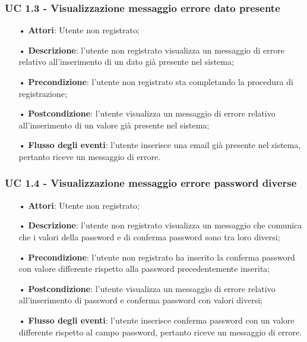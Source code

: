 \subsubsection{UC 1.3 - Visualizzazione messaggio errore dato presente}
\begin{itemize}
	\item[•]\textbf{Attori}: Utente non registrato;
	\item[•]\textbf{Descrizione}: l'utente non registrato visualizza un messaggio di errore relativo all'inserimento
	di un dato già presente nel sistema;
	\item[•]\textbf{Precondizione}: l'utente non registrato sta completando la procedura di registrazione;
	\item[•]\textbf{Postcondizione}: l'utente visualizza un messaggio di errore relativo all'inserimento di un valore già presente nel sistema;
	\item[•]\textbf{Flusso degli eventi}: l'utente inserisce una email già presente nel sistema, pertanto riceve un messaggio di errore.
\end{itemize}

\subsubsection{UC 1.4 - Visualizzazione messaggio errore password diverse}
\begin{itemize}
	\item[•]\textbf{Attori}: Utente non registrato;
	\item[•]\textbf{Descrizione}: l'utente non registrato visualizza un messaggio che comunica che i valori della password e di conferma password sono tra loro diversi;
	\item[•]\textbf{Precondizione}: l'utente non registrato ha inserito la conferma password con valore differente rispetto alla password precedentemente inserita;
	\item[•]\textbf{Postcondizione}: l'utente visualizza un messaggio di errore relativo all'inserimento di password e conferma password con valori diversi;
	\item[•]\textbf{Flusso degli eventi}: l'utente inserisce conferma password con un valore differente rispetto al campo password, pertanto riceve un messaggio di errore.
\end{itemize}

